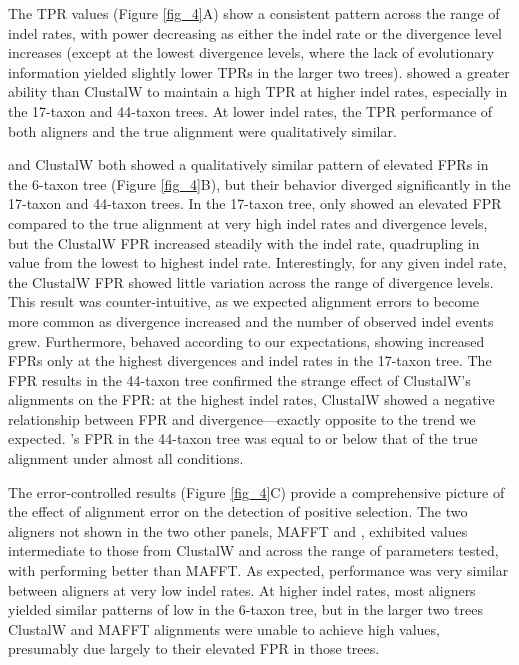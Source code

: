 \documentclass{article}
\begin{document}
The TPR values (Figure \ref{fig_4}A) show a consistent pattern
across the range of indel rates, with power decreasing as either the
indel rate or the divergence level increases (except at the lowest
divergence levels, where the lack of evolutionary information yielded
slightly lower TPRs in the larger two trees). \prankc{} showed a
greater ability than ClustalW to maintain a high TPR at higher indel
rates, especially in the 17-taxon and 44-taxon trees. At lower indel
rates, the TPR performance of both aligners and the true alignment
were qualitatively similar.

\prankc{} and ClustalW both showed a qualitatively similar pattern of
elevated FPRs in the 6-taxon tree (Figure \ref{fig_4}B), but their
behavior diverged significantly in the 17-taxon and 44-taxon trees. In
the 17-taxon tree, \prankc{} only showed an elevated FPR compared to
the true alignment at very high indel rates and divergence levels, but
the ClustalW FPR increased steadily with the indel rate, quadrupling
in value from the lowest to highest indel rate. Interestingly, for any
given indel rate, the ClustalW FPR showed little variation across the
range of divergence levels. This result was counter-intuitive, as we
expected alignment errors to become more common as divergence
increased and the number of observed indel events grew. Furthermore,
\prankc{} behaved according to our expectations, showing increased
FPRs only at the highest divergences and indel rates in the 17-taxon
tree. The FPR results in the 44-taxon tree confirmed the strange
effect of ClustalW’s alignments on the \sw FPR: at the highest indel
rates, ClustalW showed a negative relationship between FPR and
divergence---exactly opposite to the trend we expected. \prankc{}'s
FPR in the 44-taxon tree was equal to or below that of the true
alignment under almost all conditions.

The error-controlled \tpr results (Figure \ref{fig_4}C) provide a
comprehensive picture of the effect of alignment error on the detection of
\sw positive selection. The two aligners not shown in the two other
panels, MAFFT and \pranka, exhibited \tpr values intermediate to those
from ClustalW and \prankc across the range of parameters tested, with \pranka performing
better than MAFFT. As
expected, performance was very similar between aligners at very low
indel rates. At higher indel rates, most aligners yielded similar
patterns of low \tpr in the 6-taxon tree, but in the larger two trees
ClustalW and MAFFT alignments were unable to achieve high \tpr
values, presumably due largely to their elevated FPR in those trees.
\end{document}
